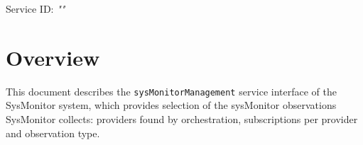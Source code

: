 \documentclass[a4paper]{arrowhead}
\begin{document}
\sloppy

\ArrowheadSetup

\begin{center}
  \vspace*{1cm}
  \huge{\arrowtitle}

  \vspace*{0.2cm}
  \LARGE{\arrowtype}
  \vspace*{1cm}

  \Large{Service ID: \textit{"\arrowid"}}

  \vspace*{\fill}


  \vspace*{1cm}
  \vspace*{\fill}

  \begin{abstract}
    This document describes the HTTP/1.1 protocol with TLS payload security and JSON payload encoding variant of the \texttt{sys\allowbreak{}Monitor\allowbreak{}Management} service of the SysMonitor system.
  \end{abstract}

  \vspace*{1cm}
\end{center}

\newpage

\tableofcontents
\newpage

\section{Overview}
\label{sec:overview}

This document describes the \texttt{sys\allowbreak{}Monitor\allowbreak{}Management} service interface of the SysMonitor system, which provides selection of the sysMonitor observations SysMonitor collects: providers found by orchestration, subscriptions per provider and observation type.
\end{document}
